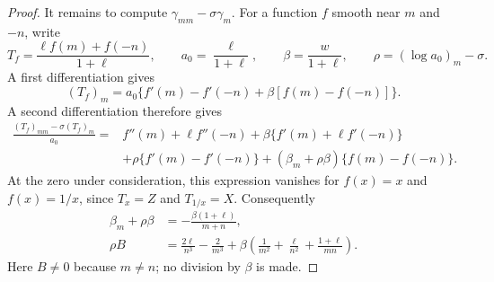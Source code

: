 \begin{proof}
It remains to compute \(\gamma_{mm}-\sigma\gamma_m\).
For a function \(f\) smooth near \(m\) and \(-n\), write
\[
 T_f=\frac{\ell f(m)+f(-n)}{1+\ell},\qquad
 a_0=\frac{\ell}{1+\ell},\qquad
 \beta=\frac{w}{1+\ell},\qquad
 \rho=(\log a_0)_m-\sigma.
\]
A first differentiation gives
\[
 (T_f)_m=a_0\{f'(m)-f'(-n)+\beta[f(m)-f(-n)]\}.
\]
A second differentiation therefore gives
\begin{align}
 \frac{(T_f)_{mm}-\sigma(T_f)_m}{a_0}
 ={}&f''(m)+\ell f''(-n)
       +\beta\{f'(m)+\ell f'(-n)\}\nonumber\\
 &+\rho\{f'(m)-f'(-n)\}
       +(\beta_m+\rho\beta)\{f(m)-f(-n)\}.
 \label{model:weighted-operator}
\end{align}
At the zero under consideration, this expression vanishes for
\(f(x)=x\) and \(f(x)=1/x\), since \(T_x=Z\) and \(T_{1/x}=X\).
Consequently
\begin{align}
 \beta_m+\rho\beta
   &=-\frac{\beta(1+\ell)}{m+n},\nonumber\\
 \rho B
   &=\frac{2\ell}{n^3}-\frac2{m^3}
     +\beta\left(\frac1{m^2}+\frac{\ell}{n^2}
                         +\frac{1+\ell}{mn}\right).
 \label{model:rho-relations}
\end{align}
Here \(B\ne0\) because \(m\ne n\); no division by \(\beta\) is made.


\end{proof}

